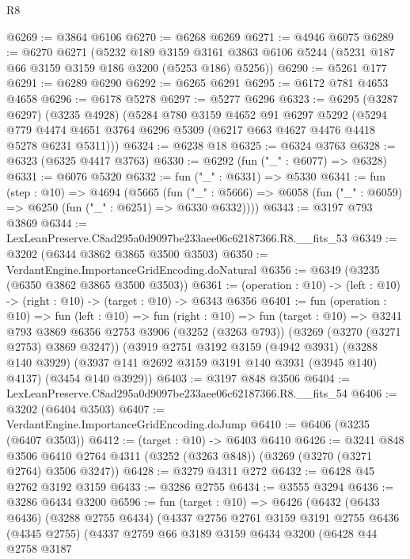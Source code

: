 \begin{lexlean}{R8}
\begin{coremodule}
@6269 := @3864 @6106
@6270 := @6268 @6269
@6271 := @4946 @6075
@6289 := @6270
    @6271
    (@5232
      @189
      @3159
      @3161
      @3863
      @6106
      @5244
      (@5231 @187 @66 @3159 @3159 @186 @3200 (@5253 @186) @5256))
@6290 := @5261 @177
@6291 := @6289 @6290
@6292 := @6265 @6291
@6295 := @6172 @781 @4653 @4658
@6296 := @6178 @5278
@6297 := @5277 @6296
@6323 := @6295
    (@3287 @6297)
    (@3235 @4928)
    (@5284
      @780
      @3159
      @4652
      @91
      @6297
      @5292
      (@5294 @779 @4474 @4651 @3764 @6296 @5309 (@6217 @663 @4627 @4476 @4418 @5278 @6231 @5311)))
@6324 := @6238 @18
@6325 := @6324 @3763
@6328 := @6323 (@6325 @4417 @3763)
@6330 := @6292 (fun ("_" : @6077) => @6328)
@6331 := @6076 @5320
@6332 := fun ("_" : @6331) => @5330
@6341 := fun (step : @10) =>
  @4694
    (@5665
      (fun ("_" : @5666) => @6058 (fun ("_" : @6059) => @6250 (fun ("_" : @6251) => @6330 @6332))))
@6343 := @3197 @793 @3869
@6344 := LexLeanPreserve.C8ad295a0d9097be233aee06c62187366.R8.__fits_53
@6349 := @3202 (@6344 @3862 @3865 @3500 @3503)
@6350 := VerdantEngine.ImportanceGridEncoding.doNatural
@6356 := @6349 (@3235 (@6350 @3862 @3865 @3500 @3503))
@6361 := (operation : @10) -> (left : @10) -> (right : @10) -> (target : @10) -> @6343 @6356
@6401 := fun (operation : @10) =>
  fun (left : @10) =>
  fun (right : @10) =>
  fun (target : @10) =>
  @3241
    @793
    @3869
    @6356
    @2753
    @3906
    (@3252 (@3263 @793))
    (@3269 (@3270 (@3271 @2753) @3869 @3247))
    (@3919
      @2751
      @3192
      @3159
      (@4942 @3931)
      (@3288 @140 @3929)
      (@3937 @141 @2692 @3159 @3191 @140 @3931 (@3945 @140) @4137)
      (@3454 @140 @3929))
@6403 := @3197 @848 @3506
@6404 := LexLeanPreserve.C8ad295a0d9097be233aee06c62187366.R8.__fits_54
@6406 := @3202 (@6404 @3503)
@6407 := VerdantEngine.ImportanceGridEncoding.doJump
@6410 := @6406 (@3235 (@6407 @3503))
@6412 := (target : @10) -> @6403 @6410
@6426 := @3241
    @848
    @3506
    @6410
    @2764
    @4311
    (@3252 (@3263 @848))
    (@3269 (@3270 (@3271 @2764) @3506 @3247))
@6428 := @3279 @4311 @272
@6432 := @6428 @45 @2762 @3192 @3159
@6433 := @3286 @2755
@6434 := @3555 @3294
@6436 := @3286 @6434 @3200
@6596 := fun (target : @10) =>
  @6426
    (@6432
      (@6433 @6436)
      (@3288 @2755 @6434)
      (@4337
        @2756
        @2761
        @3159
        @3191
        @2755
        @6436
        (@4345 @2755)
        (@4337
          @2759
          @66
          @3189
          @3159
          @6434
          @3200
          (@6428
            @44
            @2758
            @3187

\end{coremodule}
\end{lexlean}
